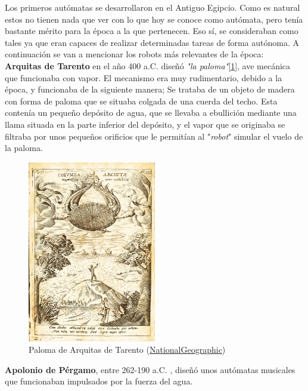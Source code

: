 Los primeros autómatas se desarrollaron en el Antiguo Egipcio. Como es natural estos no tienen nada que ver con lo que hoy se conoce como autómata, pero tenía bastante mérito para la época a la que pertenecen. Eso sí, se consideraban como tales ya que eran capaces de realizar determinadas tareas de forma autónoma. A continuación se van a mencionar los robots más relevantes de la época:\\

 \textbf{Arquitas de Tarento} en el año 400 a.C. diseñó \textit{"la paloma"}[\ref{paloma}], ave mecánica que funcionaba con vapor. El mecanismo era muy rudimentario, debido a la época, y funcionaba de la siguiente manera; Se trataba de un objeto de madera con forma de paloma que se situaba colgada de una cuerda del techo. Esta contenía un pequeño depósito de agua, que se llevaba a ebullición mediante una llama situada en la parte inferior del depósito, y el vapor que se originaba se filtraba por unos pequeños orificios que le permitían al "\textit{robot}" simular el vuelo de la paloma.\\

\begin{figure}[H]
\begin{center}
  \includegraphics[width=0.5\textwidth]{./EtapaPrimeriza/imagenes/paloma.jpg}
  \caption{Paloma de Arquitas de Tarento (\href{https://www.nationalgeographic.com.es/historia/grandes-reportajes/inventos-griegos_9395/3}{NationalGeographic})}
  \label{paloma}
\end{center}
\end{figure}


\textbf{Apolonio de Pérgamo}, entre 262-190 a.C. , diseñó unos autómatas musicales que funcionaban impulsados por la fuerza del agua.\\


